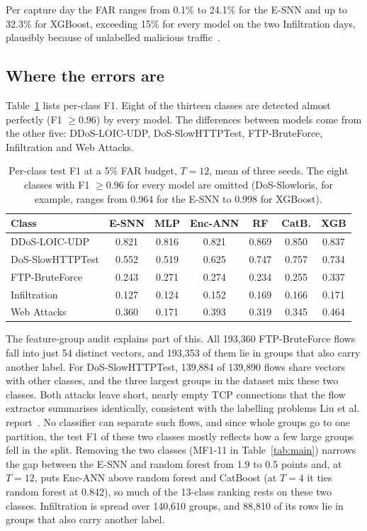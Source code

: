 \documentclass[conference]{IEEEtran}
\begin{document}
Per capture day the FAR ranges from 0.1\% to 24.1\% for the E-SNN and up to 32.3\% for XGBoost, exceeding 15\% for every model on the two Infiltration days, plausibly because of unlabelled malicious traffic~\cite{liu2022}.

\subsection{Where the errors are}
\label{sec:errors}

Table~\ref{tab:perclass} lists per-class F1. Eight of the thirteen classes are detected almost perfectly (F1 $\geq 0.96$) by every model. The differences between models come from the other five: DDoS-LOIC-UDP, DoS-SlowHTTPTest, FTP-BruteForce, Infiltration and Web Attacks.

\begin{table}[t]
\centering
\caption{Per-class test F1 at a 5\% FAR budget, $T = 12$, mean of three seeds. The eight classes with F1 $\geq 0.96$ for every model are omitted (DoS-Slowloris, for example, ranges from 0.964 for the E-SNN to 0.998 for XGBoost).}
\label{tab:perclass}
\setlength{\tabcolsep}{2.2pt}
\begin{tabular}{lcccccc}
\toprule
Class & E-SNN & MLP & Enc-ANN & RF & CatB. & XGB \\
\midrule
DDoS-LOIC-UDP & 0.821 & 0.816 & 0.821 & 0.869 & 0.850 & 0.837 \\
DoS-SlowHTTPTest & 0.552 & 0.519 & 0.625 & 0.747 & 0.757 & 0.734 \\
FTP-BruteForce & 0.243 & 0.271 & 0.274 & 0.234 & 0.255 & 0.337 \\
Infiltration & 0.127 & 0.124 & 0.152 & 0.169 & 0.166 & 0.171 \\
Web Attacks & 0.360 & 0.171 & 0.393 & 0.319 & 0.345 & 0.464 \\
\bottomrule
\end{tabular}
\end{table}

The feature-group audit explains part of this. All 193{,}360 FTP-BruteForce flows fall into just 54 distinct vectors, and 193{,}353 of them lie in groups that also carry another label. For DoS-SlowHTTPTest, 139{,}884 of 139{,}890 flows share vectors with other classes, and the three largest groups in the dataset mix these two classes. Both attacks leave short, nearly empty TCP connections that the flow extractor summarises identically, consistent with the labelling problems Liu et al. report~\cite{liu2022}. No classifier can separate such flows, and since whole groups go to one partition, the test F1 of these two classes mostly reflects how a few large groups fell in the split. Removing the two classes (MF1-11 in Table~\ref{tab:main}) narrows the gap between the E-SNN and random forest from 1.9 to 0.5 points and, at $T = 12$, puts Enc-ANN above random forest and CatBoost (at $T = 4$ it ties random forest at 0.842), so much of the 13-class ranking rests on these two classes. Infiltration is spread over 140{,}610 groups, and 88{,}810 of its rows lie in groups that also carry another label.
\end{document}
